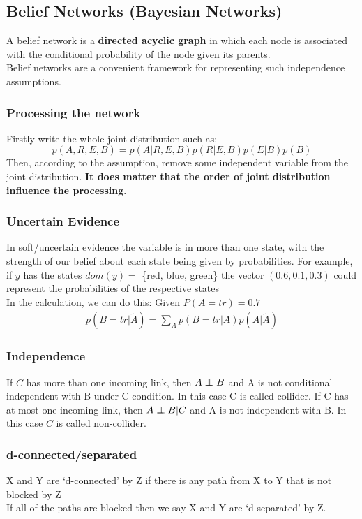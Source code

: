\documentclass[12pt,a4paper]{article}
\newcommand\independent{\protect\mathpalette{\protect\independenT}{\perp}}
\def\independenT#1#2{\mathrel{\rlap{$#1#2$}\mkern2mu{#1#2}}}
\begin{document}
\subsection*{Belief Networks (Bayesian Networks)}
A belief network is a \textbf{directed acyclic graph} in which each node is associated with the conditional probability of the node given its parents.\\
Belief networks are a convenient framework for representing such independence assumptions. 
\subsubsection*{Processing the network}
Firstly write the whole joint distribution such as:
$$
p(A,R,E,B) = p(A|R,E,B)p(R|E,B)p(E|B)p(B)
$$
Then, according to the assumption, remove some independent variable from the joint distribution. \textbf{It does matter that the order of joint distribution influence the processing}.
\subsubsection*{Uncertain Evidence}
In soft/uncertain evidence the variable is in more than one state, with the strength of our belief about each state being given by probabilities. For example, if $y$ has the states $dom(y) =$ \{red, blue, green\} the vector $(0.6, 0.1, 0.3)$ could represent the probabilities of the respective states\\
In the calculation, we can do this: Given $P(A=tr)=0.7$ 
\begin{eqnarray*}
p(B=tr|\widetilde{A}) = \sum_{A}p(B=tr|A)p(A|\widetilde{A}) 
\end{eqnarray*}
\subsubsection*{Independence}
If $C$ has more than one incoming link, then $A\independent B$ and A is not conditional independent with B under C condition. In this case C is called collider.
If C has at most one incoming link, then $A \independent B|C$ and A is not independent with B. In this case $C$ is called non-collider.
\subsubsection*{d-connected/separated}
X and Y are ‘d-connected’ by Z if there is any path from X to Y that is not blocked by Z\\
If all of the paths are blocked then we say X and Y are ‘d-separated’ by Z.
\end{document}
